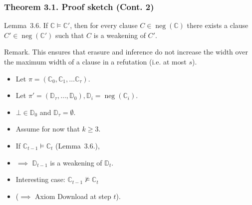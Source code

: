 \documentclass[t,usenames,dvipsnames]{beamer}
\newcommand {\nconf}{\operatorname{neg}}
\begin{document}
\begin{frame}\frametitle{Theorem 3.1. Proof sketch (Cont. 2)}
	\begin{block}{Lemma~3.6.}
		If $\mathbb{C} \models \mathbb{C}'$, then for every clause $C \in
		\nconf(\mathbb{C})$ there exists a clause $C' \in \nconf(\mathbb{C}')$ such that $C$
		is a weakening of $C'$.
	\end{block}
	\pause
	Remark. This ensures that erasure and inference do not increase the width over the maximum
	width of a clause in a refutation (i.e. at most $s$).
	\pause
	\begin{itemize}[<+->]
		\item Let $\pi = (\mathbb{C}_0, \mathbb{C}_1, \dots \mathbb{C}_{\tau})$.
		\item Let $\pi' = (\mathbb{D}_{\tau}, \dots, \mathbb{D}_0), \mathbb{D}_i =
			\nconf(\mathbb{C}_i)$.
		\item $\bot \in \mathbb{D}_0$ and $\mathbb{D}_{\tau} = \emptyset$.
		\item {\color{red}Assume} for now that $k \geq 3$.
		\item If $\mathbb{C}_{t-1} \models \mathbb{C}_{t}$ (Lemma~3.6.),
		\item[] \hspace{.5cm} $\implies$  $\mathbb{D}_{t-1}$ is a weakening of $\mathbb{D}_t$.
		\item Interesting case: $\mathbb{C}_{t-1} \not \models \mathbb{C}_{t}$
		\item[] \hspace{.5cm} ($\implies$ Axiom Download at step $t$).
	\end{itemize}
\end{frame}
\end{document}
